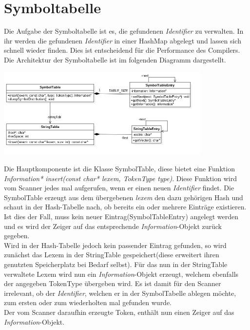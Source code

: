 \documentclass[
a4paper
]{scrreprt}
\begin{document}
	
	\section{Symboltabelle}
	Die Aufgabe der Symboltabelle ist es, die gefundenen \emph{Identifier} zu verwalten. In ihr werden die gefundenen \emph{Identifier} in einer HashMap abgelegt und lassen sich schnell wieder finden. Dies ist entscheidend für die Performance des Compilers. \\
	Die Architektur der Symboltabelle ist im folgenden Diagramm dargestellt.
	
	\begin{center}
		\includegraphics[width=0.8\textwidth]{./images/symtable_class.png}
	\end{center}
	
	Die Hauptkomponente ist die Klasse SymbolTable, diese bietet eine Funktion \emph{Information* insert(const char* lexem, TokenType type)}. Diese Funktion wird vom Scanner jedes mal aufgerufen, wenn er einen neuen \emph{Identifier} findet. Die SymbolTable erzeugt aus dem übergebenen \emph{lexem} den dazu gehörigen Hash und schaut in der Hash-Tabelle nach, ob bereits ein oder mehrere Einträge existieren. Ist dies der Fall, muss kein neuer Eintrag(SymbolTableEntry) angelegt werden und es wird der Zeiger auf das entsprechende \emph{Information}-Objekt zurück gegeben.\\
	
	Wird in der Hash-Tabelle jedoch kein passender Eintrag gefunden, so wird zunächst das Lexem in der StringTable gespeichert(diese erweitert ihren genutzten Speicherplatz bei Bedarf selbst). Für das nun in der StringTable verwaltete Lexem wird nun ein \emph{Information}-Objekt erzeugt, welchem ebenfalls der angegeben TokenType übergeben wird. Es ist damit für den Scanner irrelevant, ob der \emph{Identifier}, welchen er in der SymbolTabelle ablegen möchte, zum ersten oder zum wiederholten mal gefunden wurde.\\
	Der vom Scanner daraufhin erzeugte Token, enthält nun einen Zeiger auf das \emph{Information}-Objekt.
	
\end{document}
